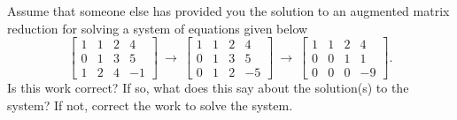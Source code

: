 \begin{exercise}\ansMark%
Assume that someone else has provided you the solution to an augmented matrix reduction for solving a system of equations given below
\begin{equation*}
\begin{bmatrix}
1 & 1 & 2 & 4 \\
0 & 1 & 3 & 5 \\
1 & 2 & 4 & -1
\end{bmatrix} \ \rightarrow \ \begin{bmatrix} 1 & 1 & 2 & 4 \\ 0 & 1 & 3 & 5 \\ 0 & 1 & 2 & -5 \end{bmatrix} \ \rightarrow \ \begin{bmatrix} 1 & 1 & 2 & 4 \\ 0 & 0 & 1 & 1 \\ 0 & 0 & 0 & -9 \end{bmatrix}.
\end{equation*} 
Is this work correct? If so, what does this say about the solution(s) to the system? If not, correct the work to solve the system.
\end{exercise}

\setcounter{exercise}{100}

